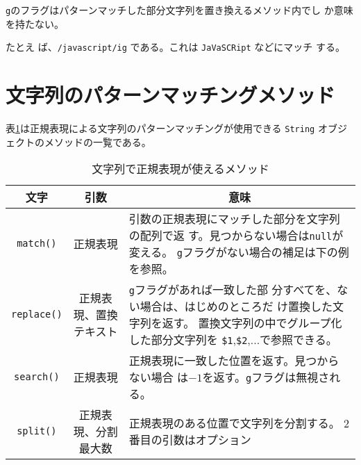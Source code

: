 \Verb+g+のフラグはパターンマッチした部分文字列を置き換えるメソッド内でし
か意味を持たない。

たとえ
ば、\Verb+/javascript/ig+ である。これは \Verb+JaVaSCRipt+ などにマッチ
する。

\section{文字列のパターンマッチングメソッド}
表\ref{RegMwthod}は正規表現による文字列のパターンマッチングが使用できる \Verb+String+
オブジェクトのメソッドの一覧である。
\begin{table}[ht]
\caption{文字列で正規表現が使えるメソッド}\label{RegMwthod}
\begin{center}
 \begin{tabular}{|c|c|m{}|}\hline
  文字&\multicolumn{1}{c|}{引数}&\multicolumn{1}{c|}{意味}\\\hline
\Verb+match()+&正規表現&引数の正規表現にマッチした部分を文字列の配列で返
	  す。見つからない場合は\Verb+null+が変える。
          \Verb+g+フラグがない場合の補足は下の例を参照。\\\hline
\Verb+replace()+&正規表現、\newline 置換テキスト&\Verb+g+フラグがあれば一致した部
	  分すべてを、ない場合は、はじめのところだ
	  け置換した文字列を返す。\newline
          置換文字列の中でグループ化した部分文字列を
	  \Verb+$1+,\Verb+$2+,...で参照できる。\\\hline
\Verb+search()+&正規表現&正規表現に一致した位置を返す。見つからない場合
	  は$-1$を返す。\Verb+g+フラグは無視される。\\\hline
\Verb+split()+&正規表現、\newline 分割最大数&正規表現のある位置で文字列を分割する。
	  2番目の引数はオプション\\\hline
\end{tabular}
\end{center}
\end{table}

